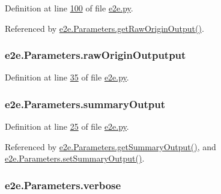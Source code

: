 Definition at line \hyperlink{e2e_8py_source_l00100}{100} of file \hyperlink{e2e_8py_source}{e2e.\+py}.



Referenced by \hyperlink{e2e_8py_source_l00102}{e2e.\+Parameters.\+get\+Raw\+Origin\+Output()}.

\subsubsection[{\texorpdfstring{raw\+Origin\+Outputput}{rawOriginOutputput}}]{\setlength{\rightskip}{0pt plus 5cm}e2e.\+Parameters.\+raw\+Origin\+Outputput}\hypertarget{classe2e_1_1_parameters_a363d9432d8f2bdcf645fa39b81e007f3}{}\label{classe2e_1_1_parameters_a363d9432d8f2bdcf645fa39b81e007f3}


Definition at line \hyperlink{e2e_8py_source_l00035}{35} of file \hyperlink{e2e_8py_source}{e2e.\+py}.

\subsubsection[{\texorpdfstring{summary\+Output}{summaryOutput}}]{\setlength{\rightskip}{0pt plus 5cm}e2e.\+Parameters.\+summary\+Output}\hypertarget{classe2e_1_1_parameters_a1f4bab2e746d2c598e20ccba0154d795}{}\label{classe2e_1_1_parameters_a1f4bab2e746d2c598e20ccba0154d795}


Definition at line \hyperlink{e2e_8py_source_l00025}{25} of file \hyperlink{e2e_8py_source}{e2e.\+py}.



Referenced by \hyperlink{e2e_8py_source_l00042}{e2e.\+Parameters.\+get\+Summary\+Output()}, and \hyperlink{e2e_8py_source_l00039}{e2e.\+Parameters.\+set\+Summary\+Output()}.

\subsubsection[{\texorpdfstring{verbose}{verbose}}]{\setlength{\rightskip}{0pt plus 5cm}e2e.\+Parameters.\+verbose}\hypertarget{classe2e_1_1_parameters_a84d862bf507bb0325f5daf3b7e5d9ab3}{}\label{classe2e_1_1_parameters_a84d862bf507bb0325f5daf3b7e5d9ab3}


